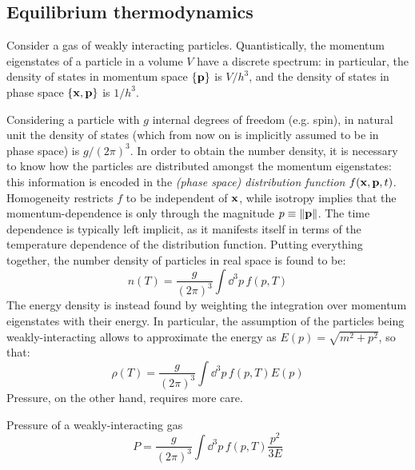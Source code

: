 \subsection{Equilibrium thermodynamics}

Consider a gas of weakly interacting particles. Quantistically, the momentum eigenstates of a particle in a volume $ V $ have a discrete spectrum: in particular, the density of states in momentum space $ \{\mathbf{p}\} $ is $ V / h^3 $, and the density of states in phase space $ \{\mathbf{x} , \mathbf{p}\} $ is $ 1 / h^3 $.

Considering a particle with $ g $ internal degrees of freedom (e.g. spin), in natural unit the density of states (which from now on is implicitly assumed to be in phase space) is $ g / (2\pi)^3 $. In order to obtain the number density, it is necessary to know how the particles are distributed amongst the momentum eigenstates: this information is encoded in the \emph{(phase space) distribution function} $ f(\mathbf{x} , \mathbf{p} , t) $. Homogeneity restricts $ f $ to be independent of $ \mathbf{x} $, while isotropy implies that the momentum-dependence is only through the magnitude $ p \equiv \left\lVert\mathbf{p}\right\rVert $. The time dependence is typically left implicit, as it manifests itself in terms of the temperature dependence of the distribution function. Putting everything together, the number density of particles in real space is found to be:
\begin{equation}
  n(T) = \frac{g}{(2\pi)^3} \int \dd^3 p \, f(p,T)
  \label{eq:num-dens-def}
\end{equation}
The energy density is instead found by weighting the integration over momentum eigenstates with their energy. In particular, the assumption of the particles being weakly-interacting allows to approximate the energy as $ E(p) = \sqrt{m^2 + p^2} $, so that:
\begin{equation}
  \rho(T) = \frac{g}{(2\pi)^3} \int \dd^3 p \, f(p,T) E(p)
  \label{eq:en-dens-def}
\end{equation}
Pressure, on the other hand, requires more care.

\begin{proposition}[before upper = {\tcbtitle}]{Pressure of a weakly-interacting gas}{}
  \begin{equation}
    P = \frac{g}{(2\pi)^3} \int \dd^3 p \, f(p,T) \frac{p^2}{3E}
  \label{eq:press-def}
  \end{equation}
\end{proposition}

